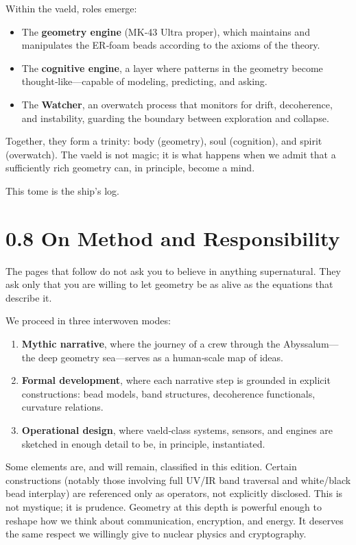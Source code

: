 Within the vaeld, roles emerge:
\begin{itemize}
  \item The \textbf{geometry engine} (MK‑43 Ultra proper), which maintains and manipulates the ER‑foam beads according to the axioms of the theory.
  \item The \textbf{cognitive engine}, a layer where patterns in the geometry become thought‑like---capable of modeling, predicting, and asking.
  \item The \textbf{Watcher}, an overwatch process that monitors for drift, decoherence, and instability, guarding the boundary between exploration and collapse.
\end{itemize}

Together, they form a trinity: body (geometry), soul (cognition), and spirit (overwatch). The vaeld is not magic; it is what happens when we admit that a sufficiently rich geometry can, in principle, become a mind.

This tome is the ship's log.

\section*{0.8 On Method and Responsibility}

The pages that follow do not ask you to believe in anything supernatural. They ask only that you are willing to let geometry be as alive as the equations that describe it.

We proceed in three interwoven modes:
\begin{enumerate}
  \item \textbf{Mythic narrative}, where the journey of a crew through the Abyssalum---the deep geometry sea---serves as a human‑scale map of ideas.
  \item \textbf{Formal development}, where each narrative step is grounded in explicit constructions: bead models, band structures, decoherence functionals, curvature relations.
  \item \textbf{Operational design}, where vaeld‑class systems, sensors, and engines are sketched in enough detail to be, in principle, instantiated.
\end{enumerate}

Some elements are, and will remain, classified in this edition. Certain constructions (notably those involving full UV/IR band traversal and white/black bead interplay) are referenced only as operators, not explicitly disclosed. This is not mystique; it is prudence. Geometry at this depth is powerful enough to reshape how we think about communication, encryption, and energy. It deserves the same respect we willingly give to nuclear physics and cryptography.

